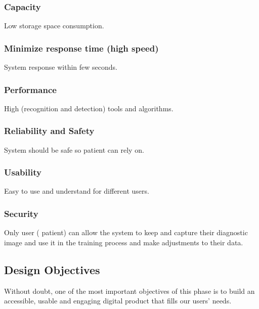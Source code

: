 \subsubsection{Capacity	}Low storage space consumption.
\subsubsection{Minimize response time (high speed)}System response within few seconds.
\subsubsection{Performance}High (recognition and detection) tools and algorithms.
\subsubsection{Reliability and Safety	}System should be safe so patient can rely on.
\subsubsection{Usability}Easy to use and understand for different users.
\subsubsection{Security}Only user ( patient) can allow the system to keep and capture their diagnostic image and use it in the training process and make adjustments to their data.
\subsection{Design Objectives }
Without doubt, one of the most important objectives of this phase is to build an accessible, usable and engaging digital product that fills our users' needs.
\newpage
